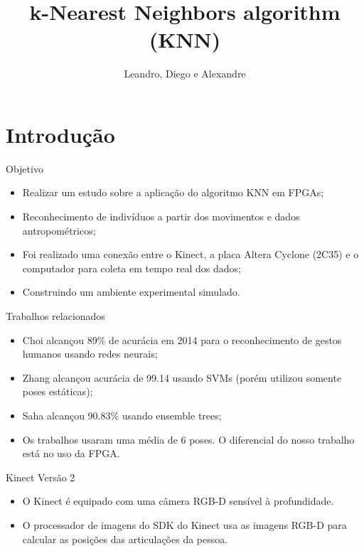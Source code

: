 \documentclass[11pt]{beamer}
\author{Leandro, Diego e Alexandre}
\title{k-Nearest Neighbors algorithm (KNN)}
\begin{document}
\begin{frame}
\titlepage
\end{frame}

\begin{frame}
\tableofcontents
\end{frame}

\section{Introdução}
\begin{frame}{Objetivo}
	\begin{itemize}
	\item Realizar um estudo sobre a aplicação do algoritmo KNN em FPGAs;
	\item Reconhecimento de indivíduos a partir dos movimentos e dados
	antropométricos;
	\item Foi realizado uma conexão entre o Kinect, a placa Altera Cyclone
	(2C35) e o computador para coleta em tempo real dos dados;
	\item Construindo um ambiente experimental simulado. 
	\end{itemize}
\end{frame}

\begin{frame}{Trabalhos relacionados}

\begin{itemize}
	\item Choi alcançou 89\% de acurácia em 2014 para o reconhecimento de gestos humanos usando redes neurais;
	\item Zhang alcançou acurácia de 99.14 usando SVMs (porém utilizou somente poses estáticas); 
	\item Saha alcançou 90.83\% usando ensemble trees;
	\item Os trabalhos usaram uma média de 6 poses. O diferencial do nosso trabalho está no uso da FPGA.
\end{itemize}
\end{frame}
\begin{frame}{Kinect Versão 2}

\begin{itemize}
	\item O Kinect é equipado com uma câmera RGB-D sensível à profundidade.
	\item O processador de imagens do SDK do Kinect usa as imagens RGB-D para
	calcular as posições das articulações da pessoa.
\end{itemize}

\end{frame}
\end{document}
